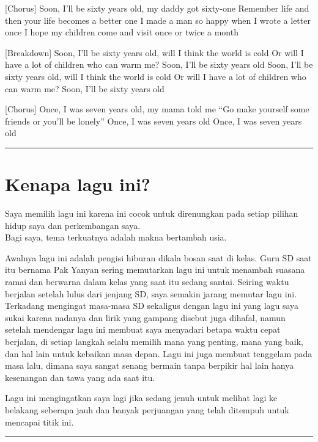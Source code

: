 \documentclass[
  letterpaper,
  DIV=11,
  numbers=noendperiod]{scrreprt}
\begin{document}
{[}Chorus{]} Soon, I'll be sixty years old, my daddy got sixty-one
Remember life and then your life becomes a better one I made a man so
happy when I wrote a letter once I hope my children come and visit once
or twice a month

{[}Breakdown{]} Soon, I'll be sixty years old, will I think the world is
cold Or will I have a lot of children who can warm me? Soon, I'll be
sixty years old Soon, I'll be sixty years old, will I think the world is
cold Or will I have a lot of children who can warm me? Soon, I'll be
sixty years old

{[}Chorus{]} Once, I was seven years old, my mama told me ``Go make
yourself some friends or you'll be lonely'' Once, I was seven years old
Once, I was seven years old

\begin{center}\rule{0.5\linewidth}{0.5pt}\end{center}

\section{Kenapa lagu ini?}\label{kenapa-lagu-ini}

Saya memilih lagu ini karena ini cocok untuk direnungkan pada setiap
pilihan hidup saya dan perkembangan saya.\\
Bagi saya, tema terkuatnya adalah makna bertambah usia.

Awalnya lagu ini adalah pengisi hiburan dikala bosan saat di kelas. Guru
SD saat itu bernama Pak Yanyan sering memutarkan lagu ini untuk menambah
suasana ramai dan berwarna dalam kelas yang saat itu sedang santai.
Seiring waktu berjalan setelah lulus dari jenjang SD, saya semakin
jarang memutar lagu ini. Terkadang mengingat masa-masa SD sekaligus
dengan lagu ini yang lagu saya sukai karena nadanya dan lirik yang
gampang disebut juga dihafal, namun setelah mendengar lagu ini membuat
saya menyadari betapa waktu cepat berjalan, di setiap langkah selalu
memilih mana yang penting, mana yang baik, dan hal lain untuk kebaikan
masa depan. Lagu ini juga membuat tenggelam pada masa lalu, dimana saya
sangat senang bermain tanpa berpikir hal lain hanya kesenangan dan tawa
yang ada saat itu.

Lagu ini mengingatkan saya lagi jika sedang jenuh untuk melihat lagi ke
belakang seberapa jauh dan banyak perjuangan yang telah ditempuh untuk
mencapai titik ini.

\begin{center}\rule{0.5\linewidth}{0.5pt}\end{center}
\end{document}
